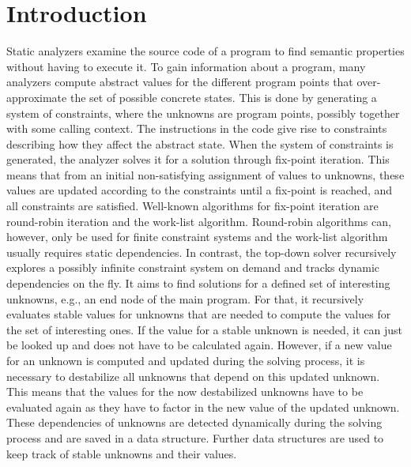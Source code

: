 \section{Introduction}
\label{sec:introduction}
Static analyzers examine the source code of a program to find semantic properties without having to execute it. To gain information about a program, many analyzers compute abstract values for the different program points that over-approximate the set of possible concrete states. This is done by generating a system of constraints, where the unknowns are program points, possibly together with some calling context. The instructions in the code give rise to constraints describing how they affect the abstract state. When the system of constraints is generated, the analyzer solves it for a solution through fix-point iteration. This means that from an initial non-satisfying assignment of values to unknowns, these values are updated according to the constraints until a fix-point is reached, and all constraints are satisfied. Well-known algorithms for fix-point iteration are round-robin iteration and the work-list algorithm. Round-robin algorithms can, however, only be used for finite constraint systems and the work-list algorithm usually requires static dependencies. In contrast, the top-down solver recursively explores a possibly infinite constraint system on demand and tracks dynamic dependencies on the fly. It aims to find solutions for a defined set of interesting unknowns, e.g., an end node of the main program. For that, it recursively evaluates stable values for unknowns that are needed to compute the values for the set of interesting ones. If the value for a stable unknown is needed, it can just be looked up and does not have to be calculated again. However, if a new value for an unknown is computed and updated during the solving process, it is necessary to destabilize all unknowns that depend on this updated unknown. This means that the values for the now destabilized unknowns have to be evaluated again as they have to factor in the new value of the updated unknown. These dependencies of unknowns are detected dynamically during the solving process and are saved in a data structure. Further data structures are used to keep track of stable unknowns and their values. 
